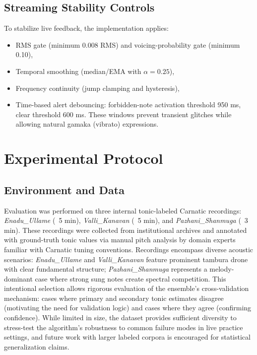 \documentclass{ieeeaccess}
\begin{document}
\subsection{Streaming Stability Controls}
To stabilize live feedback, the implementation applies:
\begin{itemize}
\item RMS gate (minimum 0.008 RMS) and voicing-probability gate (minimum 0.10),
\item Temporal smoothing (median/EMA with $\alpha=0.25$),
\item Frequency continuity (jump clamping and hysteresis),
\item Time-based alert debouncing: forbidden-note activation threshold 950 ms, clear threshold 600 ms. These windows prevent transient glitches while allowing natural gamaka (vibrato) expressions.
\end{itemize}


\section{Experimental Protocol}
\label{sec:setup}
\subsection{Environment and Data}
Evaluation was performed on three internal tonic-labeled Carnatic recordings: \textit{Enadu\_Ullame} (~5 min), \textit{Valli\_Kanavan} (~5 min), and \textit{Pazhani\_Shanmuga} (~3 min). These recordings were collected from institutional archives and annotated with ground-truth tonic values via manual pitch analysis by domain experts familiar with Carnatic tuning conventions. Recordings encompass diverse acoustic scenarios: \textit{Enadu\_Ullame} and \textit{Valli\_Kanavan} feature prominent tambura drone with clear fundamental structure; \textit{Pazhani\_Shanmuga} represents a melody-dominant case where strong sung notes create spectral competition. This intentional selection allows rigorous evaluation of the ensemble's cross-validation mechanism: cases where primary and secondary tonic estimates disagree (motivating the need for validation logic) and cases where they agree (confirming confidence). While limited in size, the dataset provides sufficient diversity to stress-test the algorithm's robustness to common failure modes in live practice settings, and future work with larger labeled corpora is encouraged for statistical generalization claims.
\end{document}
